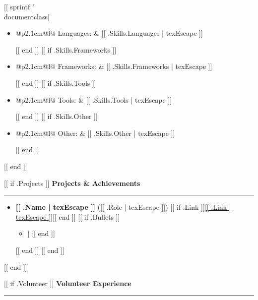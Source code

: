[[ sprintf "\\documentclass[%
\newcommand{\ressection}[1]{%
  \vspace{8pt}%
  {\large\bfseries\color{sectionblue}#1}\\[-5pt]%
  {\color{sectionblue}\rule{\linewidth}{0.8pt}}%
  \vspace{2pt}%
}
\begin{document}
\begin{itemize}[
  label={\large$\bullet$},
  leftmargin=1.5em,
  itemsep=1pt,
  topsep=3pt,
  parsep=0pt
]
[[ if .Skills.Languages ]]  \item \begin{tabular}[t]{@{}p{2.1cm}@{}l@{}}
    Languages: & [[ .Skills.Languages | texEscape ]]
  \end{tabular}[[ end ]]
[[ if .Skills.Frameworks ]]  \item \begin{tabular}[t]{@{}p{2.1cm}@{}l@{}}
    Frameworks: & [[ .Skills.Frameworks | texEscape ]]
  \end{tabular}[[ end ]]
[[ if .Skills.Tools ]]  \item \begin{tabular}[t]{@{}p{2.1cm}@{}l@{}}
    Tools: & [[ .Skills.Tools | texEscape ]]
  \end{tabular}[[ end ]]
[[ if .Skills.Other ]]  \item \begin{tabular}[t]{@{}p{2.1cm}@{}l@{}}
    Other: & [[ .Skills.Other | texEscape ]]
  \end{tabular}[[ end ]]
\end{itemize}

\vspace{3pt}
[[ end ]]

[[ if .Projects ]]
\ressection{Projects \& Achievements}

\begin{itemize}[
  label={\large$\bullet$},
  leftmargin=1.5em,
  itemsep=1pt,
  topsep=3pt,
  parsep=0pt
]
[[ range .Projects ]]  \item \textbf{[[ .Name | texEscape ]]} ([[ .Role | texEscape ]]) [[ if .Link ]]\hfill\href{https://[[ .Link | texEscape ]]}{[[ .Link | texEscape ]]}[[ end ]]
[[ if .Bullets ]]  \begin{itemize}[label=$\circ$, leftmargin=1em, topsep=1pt, itemsep=0pt, parsep=0pt]
[[ range texLines .Bullets ]]    \item [[ . | texEscape ]]
[[ end ]]  \end{itemize}[[ end ]]
[[ end ]]\end{itemize}

\vspace{10pt}
[[ end ]]

[[ if .Volunteer ]]
\ressection{Volunteer Experience}
\end{document}
